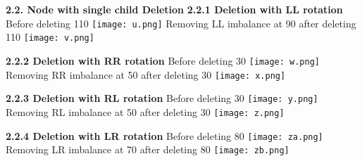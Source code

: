 \documentclass[12pt]{article}
\begin{document}
\begin{enumerate}
        \textbf{2.2. Node with single child Deletion} \newline
        \textbf{2.2.1 Deletion with LL rotation}\newline
        Before deleting 110 \newline \newline
            \texttt{[image: u.png]} \newline 
        Removing LL imbalance at 90 after deleting 110 \newline\newline
            \texttt{[image: v.png]}\newline
        \newpage
        
        \textbf{2.2.2 Deletion with RR rotation}\newline
        Before deleting 30 \newline \newline
            \texttt{[image: w.png]} \newline 
        Removing RR imbalance at 50 after deleting 30 \newline \newline
            \texttt{[image: x.png]}\newline
        \newpage
        
        \textbf{2.2.3 Deletion with RL rotation}\newline
        Before deleting 30 \newline \newline
            \texttt{[image: y.png]} \newline 
        Removing RL imbalance at 50 after deleting 30 \newline \newline
            \texttt{[image: z.png]}\newline
        \newpage
        
        \textbf{2.2.4 Deletion with LR rotation}\newline
        Before deleting 80 \newline \newline
            \texttt{[image: za.png]} \newline 
        Removing LR imbalance at 70 after deleting 80 \newline \newline
            \texttt{[image: zb.png]}
        \newpage
        

\end{enumerate}
\end{document}
